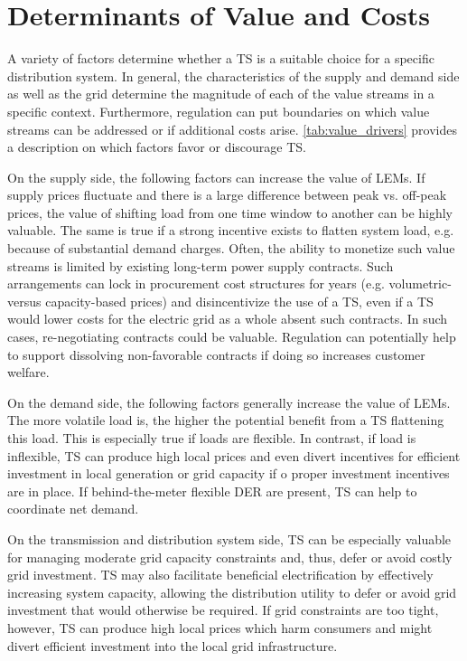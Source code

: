 \section{Determinants of Value and Costs}

A variety of factors determine whether a TS is a suitable choice for a specific distribution system. In general, the characteristics of the supply and demand side as well as the grid determine the magnitude of each of the value streams in a specific context. Furthermore, regulation can put boundaries on which value streams can be addressed or if additional costs arise. \cref{tab:value_drivers} provides a description on which factors favor or discourage TS.

On the supply side, the following factors can increase the value of LEMs. If supply prices fluctuate and there is a large difference between peak vs. off-peak prices, the value of shifting load from one time window to another can be highly valuable. The same is true if a strong incentive exists to flatten system load, e.g. because of substantial demand charges. Often, the ability to monetize such value streams is limited by existing long-term power supply contracts. Such arrangements can lock in procurement cost structures for years (e.g. volumetric- versus capacity-based prices) and disincentivize the use of a TS, even if a TS would lower costs for the electric grid as a whole absent such contracts.  In such cases, re-negotiating contracts could be valuable. Regulation can potentially help to support dissolving non-favorable contracts if doing so increases customer welfare.

On the demand side, the following factors generally increase the value of LEMs. The more volatile load is, the higher the potential benefit from a TS flattening this load. This is especially true if loads are flexible. In contrast, if load is inflexible, TS can produce high local prices and even divert incentives for efficient investment in local generation or grid capacity if o proper investment incentives are in place. If behind-the-meter flexible DER are present, TS can help to coordinate net demand.

On the transmission and distribution system side, TS can be especially valuable for managing moderate grid capacity constraints and, thus, defer or avoid costly grid investment. TS may also facilitate beneficial electrification by effectively increasing system capacity, allowing the distribution utility to defer or avoid grid investment that would otherwise be required. If grid constraints are too tight, however, TS can produce high local prices which harm consumers and might divert efficient investment into the local grid infrastructure.

